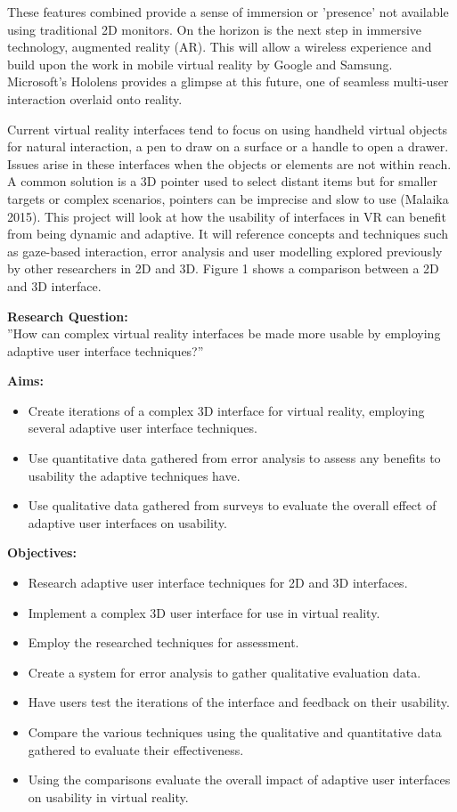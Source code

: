\documentclass[9pt,twocolumn]{article}
\begin{document}
These features combined provide a sense of immersion or 'presence' not available using traditional 2D monitors. On the horizon is the next step in immersive technology, augmented reality (AR). This will allow a wireless experience and build upon the work in mobile virtual reality by Google and Samsung. Microsoft's Hololens provides a glimpse at this future, one of seamless multi-user interaction overlaid onto reality.

Current virtual reality interfaces tend to focus on using handheld virtual objects for natural interaction, a pen to draw on a surface or a handle to open a drawer. Issues arise in these interfaces when the objects or elements are not within reach. A common solution is a 3D pointer used to select distant items but for smaller targets or complex scenarios, pointers can be imprecise and slow to use (Malaika 2015). This project will look at how the usability of interfaces in VR can benefit from being dynamic and adaptive. It will reference concepts and techniques such as gaze-based interaction, error analysis and user modelling explored previously by other researchers in 2D and 3D. Figure 1 shows a comparison between a 2D and 3D interface.

\textbf{Research Question:} \\
''How can complex virtual reality interfaces be made more usable by employing adaptive user interface techniques?''

\textbf{Aims:}
\begin{itemize}[noitemsep,topsep=0pt]
\item Create iterations of a complex 3D interface for virtual reality, employing several adaptive user interface techniques.
\item Use quantitative data gathered from error analysis to assess any benefits to usability the adaptive techniques have.
\item Use qualitative data gathered from surveys to evaluate the overall effect of adaptive user interfaces on usability.
\end{itemize}
\textbf{Objectives:}
\begin{itemize}[noitemsep,topsep=0pt]
\item Research adaptive user interface techniques for 2D and 3D interfaces.
\item Implement a complex 3D user interface for use in virtual reality.
\item Employ the researched techniques for assessment.
\item Create a system for error analysis to gather qualitative evaluation data.
\item Have users test the iterations of the interface and feedback on their usability.
\item Compare the various techniques using the qualitative and quantitative data gathered to evaluate their effectiveness.
\item Using the comparisons evaluate the overall impact of adaptive user interfaces on usability in virtual reality.
\end{itemize}
\end{document}
